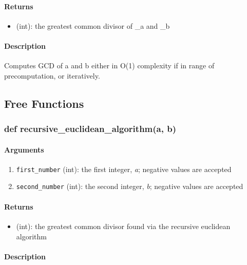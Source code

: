 \documentclass[refman]{scrartcl}
\begin{document}
\paragraph*{Returns}

\begin{itemize}
	\item (int): the greatest common divisor of \_a and \_b
\end{itemize}

\paragraph*{Description}

Computes GCD of a and b either in O(1) complexity if in range of precomputation, or iteratively.

\subsection{Free Functions}

\subsubsection{def recursive\_euclidean\_algorithm(a, b)}

\paragraph*{Arguments}

\begin{enumerate}
  \item \texttt{first\_number} (int): the first integer, \textit{a}; negative values are accepted
  \item \texttt{second\_number} (int): the second integer, \textit{b}; negative values are accepted
\end{enumerate}

\paragraph*{Returns}

\begin{itemize}
  \item (int): the greatest common divisor found via the recursive euclidean algorithm
\end{itemize}

\paragraph*{Description}
\end{document}
